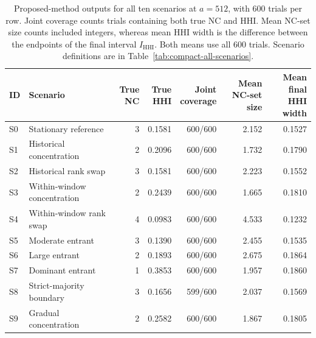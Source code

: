 \begin{table}[!t]
\centering
\small
\caption{Proposed-method outputs for all ten scenarios at $a=512$, with 600 trials per row. Joint coverage counts trials containing both true NC and HHI. Mean NC-set size counts included integers, whereas mean HHI width is the difference between the endpoints of the final interval $I_{\mathrm{HHI}}$. Both means use all 600 trials. Scenario definitions are in Table~\ref{tab:compact-all-scenarios}.}
\label{tab:all-scenario-results}
\setlength{\tabcolsep}{3pt}
\renewcommand{\arraystretch}{1.12}
\begin{tabular}{@{}l>{\raggedright\arraybackslash}p{}rrrrr@{}}
\toprule
ID & Scenario & \shortstack{True\\NC} & \shortstack{True\\HHI} & \shortstack{Joint\\coverage} & \shortstack{Mean\\NC-set size} & \shortstack{Mean final\\HHI width} \\
\midrule
S0 & Stationary reference & 3 & 0.1581 & 600/600 & 2.152 & 0.1527 \\
S1 & Historical concentration & 2 & 0.2096 & 600/600 & 1.732 & 0.1790 \\
S2 & Historical rank swap & 3 & 0.1581 & 600/600 & 2.223 & 0.1552 \\
S3 & Within-window concentration & 2 & 0.2439 & 600/600 & 1.665 & 0.1810 \\
S4 & Within-window rank swap & 4 & 0.0983 & 600/600 & 4.533 & 0.1232 \\
S5 & Moderate entrant & 3 & 0.1390 & 600/600 & 2.455 & 0.1535 \\
S6 & Large entrant & 2 & 0.1893 & 600/600 & 2.675 & 0.1864 \\
S7 & Dominant entrant & 1 & 0.3853 & 600/600 & 1.957 & 0.1860 \\
S8 & Strict-majority boundary & 3 & 0.1656 & 599/600 & 2.037 & 0.1569 \\
S9 & Gradual concentration & 2 & 0.2582 & 600/600 & 1.867 & 0.1805 \\
\bottomrule
\end{tabular}
\end{table}
